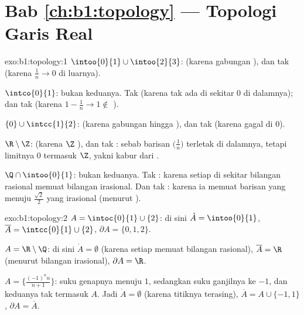 \section*{Bab \ref{ch:b1:topology} --- Topologi Garis Real}

\begin{solution}{exo:b1:topology:1}
$\intoo{0}{1} \cup \intoo{2}{3}$:  (karena gabungan ), dan tak
 (karena $\frac 1n \to 0$ di luarnya).

$\intco{0}{1}$: bukan keduanya. Tak  (karena tak ada  di sekitar $0$ di dalamnya);
dan tak  (karena $1 - \frac1n \to 1 \notin$ ).

$\{0\} \cup \intcc{1}{2}$:  (karena gabungan hingga ), dan tak
 (karena gagal di $0$).

$\R \setminus \Z$:  (karena $\Z$ ), dan tak : sebab barisan
$\bigl(\frac 1n\bigr)$ terletak di dalamnya, tetapi limitnya $0$ termasuk $\Z$,
yakni kabur dari .

$\Q \cap \intoo{0}{1}$: bukan keduanya. Tak : karena setiap  di sekitar
bilangan rasional memuat bilangan irasional. Dan tak : karena ia memuat barisan
yang menuju $\frac{\sqrt 2}{2}$ yang irasional (menurut ).
\end{solution}

\begin{solution}{exo:b1:topology:2}
$A = \intoc{0}{1} \cup \{2\}$: di sini $\mathring A = \intoo{0}{1}$,
$\overline A = \intcc{0}{1} \cup \{2\}$, $\partial A = \{0, 1, 2\}$.

$A = \R \setminus \Q$: di sini $\mathring A = \emptyset$ (karena setiap 
memuat bilangan rasional), $\overline A = \R$ (menurut 
bilangan irasional), $\partial A = \R$.

$A = \bigl\{\frac{(-1)^n n}{n+1}\bigr\}$: suku genapnya menuju $1$,
sedangkan suku ganjilnya ke $-1$, dan keduanya tak termasuk $A$. Jadi $\mathring A =
\emptyset$ (karena titiknya terasing), $\overline A = A \cup \{-1, 1\}$,
$\partial A = \overline A$.
\end{solution}

